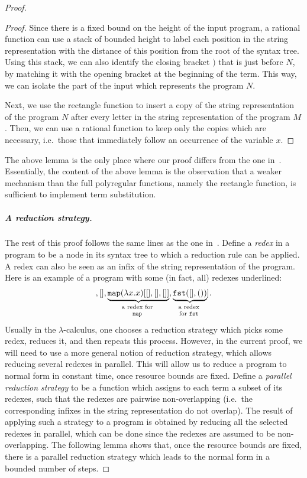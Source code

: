 \documentclass[a4paper,UKenglish,cleveref, autoref, thm-restate]{lipics-v2021}
\newcommand{\myunderbrace}[2]{\underbrace{#1}_{\mathclap{\text{\scriptsize 
\begin{tabular}{c}
	#2
\end{tabular} }}}}
\begin{document}
\begin{proof}
\begin{proof}
        Since there is a fixed bound on the height of the input program, a rational function can use a stack of bounded height to  label each position in the string representation with the distance of this position from the root of the syntax tree. Using this stack, we can also identify the closing bracket $)$ that is just before $N$, by matching it with the opening bracket at the beginning of the term. This way, we can isolate the part of the input which represents the program $N$. 

           Next, we use the rectangle function to insert a copy of the string representation of the program $N$ after every letter in the string representation of the program $M$. Then, we can use a rational function to keep only the copies which are necessary, i.e.~those that immediately follow an occurrence of the variable $x$. 
    \end{proof}
    The above lemma is the only place where our proof differs from the one in~\cite{polyregular-survey}. Essentially, the content of the above lemma is the  observation that a weaker mechanism than the full polyregular functions, namely the rectangle function, is sufficient to implement term substitution.

  \subparagraph{A reduction strategy.} The rest of this proof follows the same lines as the one in~\cite[Theorem 4.1]{polyregular-survey}. Define a \emph{redex} in a program to be a node in its syntax tree to which a reduction rule can be applied. A redex can also be seen as an infix of the string representation of the program. Here is an example of a program with some (in fact, all) redexes underlined:
    \begin{align*}
    [ \myunderbrace{(\lambda x.x) []}{a redex for \\ $\lambda$-abstraction}, [], [], \myunderbrace{\mapterm (\lambda x. x) [[],[],[]]}{a redex for \\ $\mapterm$}, \myunderbrace{\fstterm ([],())}{a redex \\ for $\fstterm$}].
    \end{align*}
    Usually in the $\lambda$-calculus, one chooses a reduction strategy which picks some redex, reduces it, and then repeats this process. However, in the current proof, we will need to use a more general notion of reduction strategy, which allows reducing several redexes in parallel. This will allow us to reduce a program to normal form in constant time, once resource bounds are fixed. Define a 
     \emph{parallel reduction strategy} to be a function which assigns to each term a subset of its redexes, such that the redexes are pairwise non-overlapping (i.e.~the corresponding infixes in the string representation do not overlap). The result of applying such a strategy to a program is obtained by reducing all the selected redexes in parallel, which can be done since the redexes are assumed to be non-overlapping. The following lemma shows that, once the resource bounds are fixed, there is a parallel reduction strategy which leads to the normal form in a bounded number of steps.
     


\end{proof}
\end{document}
